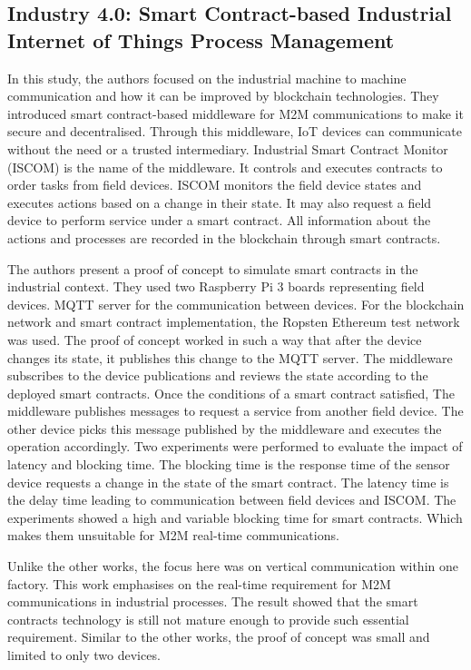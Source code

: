 \documentclass[runningheads]{llncs}
\begin{document}
\subsection{Industry 4.0: Smart Contract-based Industrial Internet of Things Process Management \cite{Garrocho2019}}

In this study, the authors focused on the industrial machine to machine communication and how it can be improved by blockchain technologies. They introduced smart contract-based middleware for M2M communications to make it secure and decentralised. Through this middleware, IoT devices can communicate without the need or a trusted intermediary. Industrial Smart Contract Monitor (ISCOM) is the name of the middleware. It controls and executes contracts to order tasks from field devices. ISCOM monitors the field device states and executes actions based on a change in their state. It may also request a field device to perform service under a smart contract. All information about the actions and processes are recorded in the blockchain through smart contracts. 

\bigbreak

\noindent
 The authors present a proof of concept to simulate smart contracts in the industrial context. They used two Raspberry Pi 3 boards representing field devices. MQTT server for the communication between devices. For the blockchain network and smart contract implementation, the Ropsten Ethereum test network was used. The proof of concept worked in such a way that after the device changes its state, it publishes this change to the MQTT server. The middleware subscribes to the device publications and reviews the state according to the deployed smart contracts. Once the conditions of a smart contract satisfied, The middleware publishes messages to request a service from another field device. The other device picks this message published by the middleware and executes the operation accordingly. Two experiments were performed to evaluate the impact of latency and blocking time. The blocking time is the response time of the sensor device requests a change in the state of the smart contract.  The latency time is the delay time leading to communication between field devices and ISCOM. The experiments showed a high and variable blocking time for smart contracts. Which makes them unsuitable for M2M real-time communications. 

\bigbreak

\noindent
Unlike the other works, the focus here was on vertical communication within one factory. This work emphasises on the real-time requirement for M2M communications in industrial processes. The result showed that the smart contracts technology is still not mature enough to provide such essential requirement. Similar to the other works, the proof of concept was small and limited to only two devices. 
\end{document}
